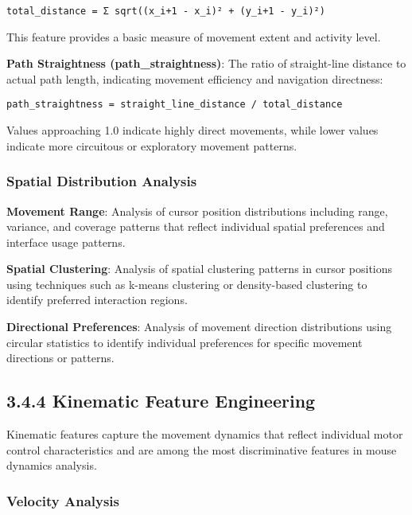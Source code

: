 \documentclass[
  12pt,
  a4paper,
]{report}
\begin{document}
\begin{verbatim}
total_distance = Σ sqrt((x_i+1 - x_i)² + (y_i+1 - y_i)²)
\end{verbatim}

This feature provides a basic measure of movement extent and activity
level.

\textbf{Path Straightness (path\_straightness)}: The ratio of
straight-line distance to actual path length, indicating movement
efficiency and navigation directness:

\begin{verbatim}
path_straightness = straight_line_distance / total_distance
\end{verbatim}

Values approaching 1.0 indicate highly direct movements, while lower
values indicate more circuitous or exploratory movement patterns.

\subsubsection{Spatial Distribution
Analysis}\label{spatial-distribution-analysis}

\textbf{Movement Range}: Analysis of cursor position distributions
including range, variance, and coverage patterns that reflect individual
spatial preferences and interface usage patterns.

\textbf{Spatial Clustering}: Analysis of spatial clustering patterns in
cursor positions using techniques such as k-means clustering or
density-based clustering to identify preferred interaction regions.

\textbf{Directional Preferences}: Analysis of movement direction
distributions using circular statistics to identify individual
preferences for specific movement directions or patterns.

\subsection{3.4.4 Kinematic Feature
Engineering}\label{kinematic-feature-engineering}

Kinematic features capture the movement dynamics that reflect individual
motor control characteristics and are among the most discriminative
features in mouse dynamics analysis.

\subsubsection{Velocity Analysis}\label{velocity-analysis}
\end{document}
